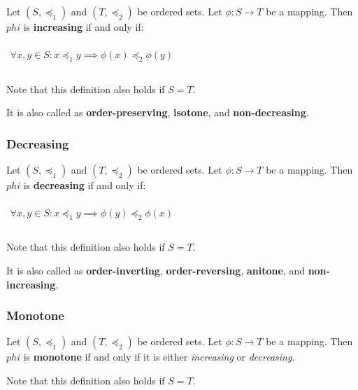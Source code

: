 Let $(S, \preceq_1)$ and $(T, \preceq_2)$ be ordered sets. Let
$\phi: S \to T$ be a mapping. Then $phi$ is \textbf{increasing} if and
only if:

\begin{math}
  \begin{array}{c}
    \\
    \forall x, y \in S: x \preceq_1 y \implies \phi(x) \preceq_2 \phi(y) \\
    \\
  \end{array}
\end{math}

Note that this definition also holds if $S = T$.

It is also called as \textbf{order-preserving}, \textbf{isotone}, and
\textbf{non-decreasing}.

\subsubsection{Decreasing}
\label{sec:decreasing}

Let $(S, \preceq_1)$ and $(T, \preceq_2)$ be ordered sets. Let
$\phi: S \to T$ be a mapping. Then $phi$ is \textbf{decreasing} if and
only if:

\begin{math}
  \begin{array}{c}
    \\
    \forall x, y \in S: x \preceq_1 y \implies \phi(y) \preceq_2 \phi(x) \\
    \\
  \end{array}
\end{math}

Note that this definition also holds if $S = T$.

It is also called as \textbf{order-inverting},
\textbf{order-reversing}, \textbf{anitone}, and
\textbf{non-increasing}.


\subsubsection{Monotone}
\label{sec:monotone}


Let $(S, \preceq_1)$ and $(T, \preceq_2)$ be ordered sets. Let
$\phi: S \to T$ be a mapping. Then $phi$ is \textbf{monotone} if and
only if it is either \textit{increasing} or \textit{decreasing}.

Note that this definition also holds if $S = T$.




